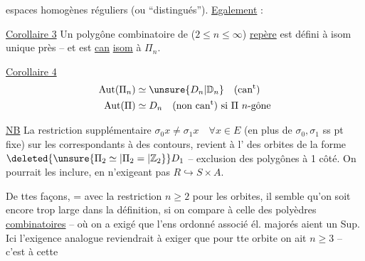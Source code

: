espaces homogènes réguliers (ou ``distingués'').
\uline{Egalement}  :

\uline{Corollaire 3} Un polygône combinatoire de 
($2\leq n\leq\infty$)  \uline{ repère} est défini à
isom unique près -- et est \uline{can} \uline{isom}
à $\Pi_n$.

\uline{Corollaire 4}
\[
\begin{aligned}
\mathrm{Aut}(\Pi_n)&\simeq\unsure{D_n|\mathbb D_n}\quad(\text{can\textsuperscript{t}})\\
\mathrm{Aut}(\Pi)&\simeq D_n\quad(\text{non can\textsuperscript{t}})\ \text{si }\Pi\ n\text{-gône}
\end{aligned}
\]

\uline{NB} La restriction supplémentaire $\sigma_0x\ne\sigma_1x\quad\forall x\in E$
(en plus de $\sigma_0,\sigma_1$ ss pt fixe) sur les
  correspondants à des contours,
revient à l'  des orbites de la
forme $\deleted{\unsure{\Pi_2\simeq|\Pi_2=|\mathbb Z_2}}D_1$ --  exclusion des
polygônes à 1 côté. On pourrait les
inclure, en n'exigeant pas $R\hookrightarrow S\times A$.

De ttes façons, = avec la restriction $n\geq 2$
pour les orbites, il semble qu'on soit encore
trop large dans la définition, si on compare
à celle des polyèdres \uline{combinatoires} -- où
on a exigé que  l'ens ordonné associé
 él. majorés aient un Sup. Ici 
l'exigence analogue reviendrait à exiger que
pour tte orbite on ait $n\geq3$ -- c'est à cette
